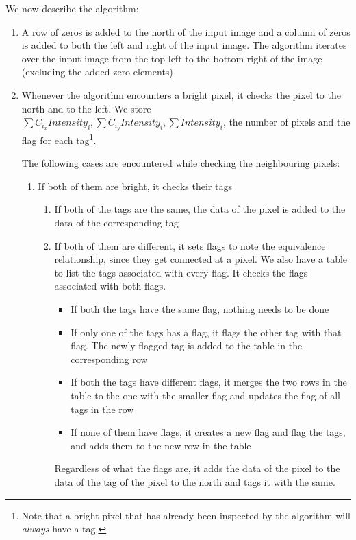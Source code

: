 We now describe the algorithm:
\begin{enumerate}
    \item A row of zeros is added to the north of the input image and a column of zeros is added to both the left and right of the input image. The algorithm iterates over the input image from the top left to the bottom right of the image (excluding the added zero elements)
    \item Whenever the algorithm encounters a bright pixel, it checks the pixel to the north and to the left. We store $ \sum C_{i_{x}}Intensity_{i}, \sum C_{i_{y}}Intensity_{i}, \sum Intensity_{i} $, the number of pixels and the flag for each tag\footnote{Note that a bright pixel that has already been inspected by the algorithm will \emph{always} have a tag.}.
    
    The following cases are encountered while checking the neighbouring pixels:
    \begin{enumerate}
        \item If both of them are bright, it checks their tags
        \begin{enumerate}
            \item If both of the tags are the same, the data of the pixel is added to the data of the corresponding tag
            \item If both of them are different, it sets flags to note the equivalence relationship, since they get connected at a pixel. We also have a table to list the tags associated with every flag. It checks the flags associated with both flags.
            \begin{itemize}
                \item If both the tags have the same flag, nothing needs to be done
                \item If only one of the tags has a flag, it flags the other tag with that flag. The newly flagged tag is added to the table in the corresponding row
                \item If both the tags have different flags, it merges the two rows in the table to the one with the smaller flag and updates the flag of all tags in the row
                \item If none of them have flags, it creates a new flag and flag the tags, and adds them to the new row in the table
            \end{itemize}
        Regardless of what the flags are, it adds the data of the pixel to the data of the tag of the pixel to the north and tags it with the same.

\end{enumerate}
\end{enumerate}
\end{enumerate}
